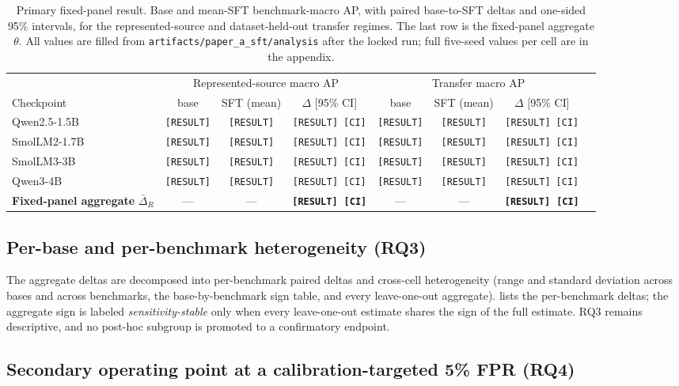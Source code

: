 \documentclass[sigconf,nonacm]{acmart}
\newcommand{\RES}{\texttt{[RESULT]}}
\newcommand{\CI}{\texttt{[CI]}}
\begin{document}
\begin{table}[t]
\centering
\small
\caption{Primary fixed-panel result. Base and mean-SFT benchmark-macro AP, with paired base-to-SFT deltas and one-sided 95\% intervals, for the represented-source and dataset-held-out transfer regimes. The last row is the fixed-panel aggregate $\theta$. All values are filled from \texttt{artifacts/paper\_a\_sft/analysis} after the locked run; full five-seed values per cell are in the appendix.}
\label{tab:primary}
\begin{tabular}{lccccccc}
\toprule
 & \multicolumn{3}{c}{Represented-source macro AP} & \multicolumn{3}{c}{Transfer macro AP} \\
\cmidrule(lr){2-4}\cmidrule(lr){5-7}
Checkpoint & base & SFT (mean) & $\Delta$ [95\% CI] & base & SFT (mean) & $\Delta$ [95\% CI] \\
\midrule
Qwen2.5-1.5B & \RES & \RES & \RES\ \CI & \RES & \RES & \RES\ \CI \\
SmolLM2-1.7B & \RES & \RES & \RES\ \CI & \RES & \RES & \RES\ \CI \\
SmolLM3-3B   & \RES & \RES & \RES\ \CI & \RES & \RES & \RES\ \CI \\
Qwen3-4B     & \RES & \RES & \RES\ \CI & \RES & \RES & \RES\ \CI \\
\midrule
\textbf{Fixed-panel aggregate }$\bar\Delta_R$ & --- & --- & \textbf{\RES\ \CI} & --- & --- & \textbf{\RES\ \CI} \\
\bottomrule
\end{tabular}
\end{table}

\subsection{Per-base and per-benchmark heterogeneity (RQ3)}
\label{subsec:heterogeneity}

The aggregate deltas are decomposed into per-benchmark paired deltas and cross-cell heterogeneity (range and standard deviation across bases and across benchmarks, the base-by-benchmark sign table, and every leave-one-out aggregate).  lists the per-benchmark deltas; the aggregate sign is labeled \emph{sensitivity-stable} only when every leave-one-out estimate shares the sign of the full estimate. RQ3 remains descriptive, and no post-hoc subgroup is promoted to a confirmatory endpoint.

\subsection{Secondary operating point at a calibration-targeted 5\% FPR (RQ4)}
\label{subsec:operating-point}
\end{document}
